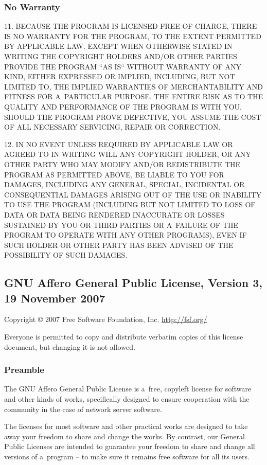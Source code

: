 \documentclass[a4paper, 11pt, twoside]{article}
\begin{document}
\subsubsection{No Warranty}

11. BECAUSE THE PROGRAM IS LICENSED FREE OF CHARGE, THERE IS NO WARRANTY FOR THE PROGRAM, TO THE EXTENT PERMITTED BY APPLICABLE LAW. EXCEPT WHEN OTHERWISE STATED IN WRITING THE COPYRIGHT HOLDERS AND/OR OTHER PARTIES PROVIDE THE PROGRAM “AS IS“ WITHOUT WARRANTY OF ANY KIND, EITHER EXPRESSED OR IMPLIED, INCLUDING, BUT NOT LIMITED TO, THE IMPLIED WARRANTIES OF MERCHANTABILITY AND FITNESS FOR A~PARTICULAR PURPOSE. THE ENTIRE RISK AS TO THE QUALITY AND PERFORMANCE OF THE PROGRAM IS WITH YOU. SHOULD THE PROGRAM PROVE DEFECTIVE, YOU ASSUME THE COST OF ALL NECESSARY SERVICING, REPAIR OR CORRECTION.

12. IN NO EVENT UNLESS REQUIRED BY APPLICABLE LAW OR AGREED TO IN WRITING WILL ANY COPYRIGHT HOLDER, OR ANY OTHER PARTY WHO MAY MODIFY AND/OR REDISTRIBUTE THE PROGRAM AS PERMITTED ABOVE, BE LIABLE TO YOU FOR DAMAGES, INCLUDING ANY GENERAL, SPECIAL, INCIDENTAL OR CONSEQUENTIAL DAMAGES ARISING OUT OF THE USE OR INABILITY TO USE THE PROGRAM (INCLUDING BUT NOT LIMITED TO LOSS OF DATA OR DATA BEING RENDERED INACCURATE OR LOSSES SUSTAINED BY YOU OR THIRD PARTIES OR A~FAILURE OF THE PROGRAM TO OPERATE WITH ANY OTHER PROGRAMS), EVEN IF SUCH HOLDER OR OTHER PARTY HAS BEEN ADVISED OF THE POSSIBILITY OF SUCH DAMAGES.

\subsection{GNU Affero General Public License, Version 3, 19 November 2007}

Copyright © 2007 Free Software Foundation, Inc. \url{http://fsf.org/}

Everyone is permitted to copy and distribute verbatim copies of this license document, but changing it is not allowed.

\subsubsection{Preamble}

The GNU Affero General Public License is a~free, copyleft license for software and other kinds of works, specifically designed to ensure cooperation with the community in the case of network server software.

The licenses for most software and other practical works are designed to take away your freedom to share and change the works. By contrast, our General Public Licenses are intended to guarantee your freedom to share and change all versions of a~program -- to make sure it remains free software for all its users.
\end{document}
